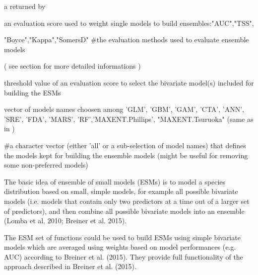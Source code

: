 \documentclass[a4paper]{book}
\begin{document}
\begin{Arguments}
\begin{ldescription}
\item[\code{ESM.modeling.output}] a  returned by 

\item[\code{weighting.score}] an evaluation score used to weight single models to build ensembles:"AUC","TSS",

"Boyce","Kappa","SomersD" \#the evaluation methods used to evaluate ensemble models 

( see    section for more detailed informations )

\item[\code{threshold}] 
threshold value of an evaluation score to select the bivariate model(s) included for building the ESMs

\item[\code{models}] 
vector of models names choosen among 'GLM', 'GBM', 'GAM', 'CTA', 'ANN', 'SRE', 'FDA', 'MARS', 'RF','MAXENT.Phillips', "MAXENT.Tsuruoka" (same as in )

\#a character vector (either 'all' or a sub-selection of model names) that defines the models kept for building the ensemble models (might be useful for removing some non-preferred models)


\end{ldescription}
\end{Arguments}
%
\begin{Details}\relax
The basic idea of ensemble of small models (ESMs) is to model a species distribution based on small, simple models, for example all possible bivariate models (i.e. models that contain only two predictors at a time out of a larger set of predictors), and then combine all possible bivariate models into an ensemble (Lomba et al. 2010; Breiner et al. 2015).

The ESM set of functions could be used to build ESMs using simple bivariate models which are averaged using weights based on model performances (e.g. AUC) according to Breiner et al. (2015). They provide full functionality of the approach described in Breiner et al. (2015).


\end{Details}
%
\end{document}
